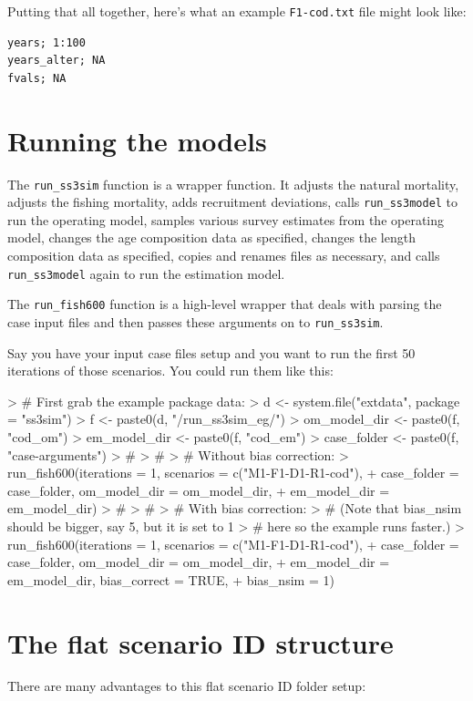 \documentclass[12pt]{article}
\begin{document}
Putting that all together, here's what an example \texttt{F1-cod.txt} file 
might look like:

\begin{verbatim}
years; 1:100
years_alter; NA 
fvals; NA
\end{verbatim}

\section*{Running the models}

The \texttt{run\_ss3sim} function is a wrapper function. It adjusts the natural 
mortality, adjusts the fishing mortality, adds recruitment deviations, calls 
\texttt{run\_ss3model} to run the operating model, samples various survey 
estimates from the operating model, changes the age composition data as 
specified, changes the length composition data as specified, copies and renames 
files as necessary, and calls \texttt{run\_ss3model} again to run the 
estimation model.

The \texttt{run\_fish600} function is a high-level wrapper that deals with 
parsing the case input files and then passes these arguments on to 
\texttt{run\_ss3sim}.

Say you have your input case files setup and you want to run the first 
50 iterations of those scenarios. You could run them like this:

\begin{Schunk}
\begin{Sinput}
> # First grab the example package data:
> d <- system.file("extdata", package = "ss3sim")
> f <- paste0(d, "/run_ss3sim_eg/")
> om_model_dir <- paste0(f, "cod_om")
> em_model_dir <- paste0(f, "cod_em")
> case_folder <- paste0(f, "case-arguments")
> #
> #
> # Without bias correction:
> run_fish600(iterations = 1, scenarios = c("M1-F1-D1-R1-cod"),
+ case_folder = case_folder, om_model_dir = om_model_dir,
+ em_model_dir = em_model_dir)
> #
> #
> # With bias correction:
> # (Note that bias_nsim should be bigger, say 5, but it is set to 1
> # here so the example runs faster.)
> run_fish600(iterations = 1, scenarios = c("M1-F1-D1-R1-cod"),
+ case_folder = case_folder, om_model_dir = om_model_dir,
+ em_model_dir = em_model_dir, bias_correct = TRUE,
+ bias_nsim = 1)
\end{Sinput}
\end{Schunk}


\section*{The flat scenario ID structure}
There are many advantages to this flat scenario ID folder setup:
\end{document}
